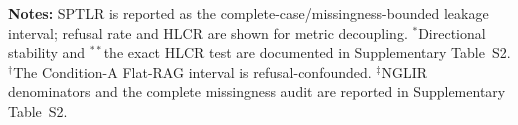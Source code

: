 \begin{table}[!t]
\caption{Compact Temporal Parametric Leakage Summary ($N=50$ historical queries; 400 evaluated responses). The full complete-case, missingness-bounded, and hypothesis-level audit is preserved in Supplementary Table~S2.}
\label{tab:temporal_leakage_probe}
\centering
{}
\vspace{1mm}
\raggedright \scriptsize \textbf{Notes:} SPTLR is reported as the complete-case/missingness-bounded leakage interval; refusal rate and HLCR are shown for metric decoupling. $^*$Directional stability and $^{**}$the exact HLCR test are documented in Supplementary Table~S2. $^\dagger$The Condition-A Flat-RAG interval is refusal-confounded. $^\ddagger$NGLIR denominators and the complete missingness audit are reported in Supplementary Table~S2.
\end{table}

